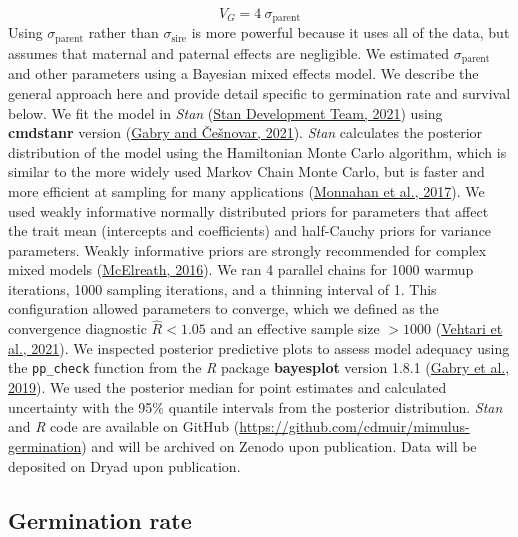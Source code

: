 \documentclass[
  12pt,
]{article}
\begin{document}
\[V_G = 4~\sigma_{\mathrm{parent}}\]
Using \(\sigma_{\mathrm{parent}}\) rather than \(\sigma_{\mathrm{sire}}\) is more powerful because it uses all of the data, but assumes that maternal and paternal effects are negligible. We estimated \(\sigma_{\mathrm{parent}}\) and other parameters using a Bayesian mixed effects model. We describe the general approach here and provide detail specific to germination rate and survival below. We fit the model in \emph{Stan} (\protect\hyperlink{ref-stan_development_team_stan_2021}{Stan Development Team, 2021}) using \textbf{cmdstanr} version (\protect\hyperlink{ref-gabry_cmdstanr_2021}{Gabry and Češnovar, 2021}). \emph{Stan} calculates the posterior distribution of the model using the Hamiltonian Monte Carlo algorithm, which is similar to the more widely used Markov Chain Monte Carlo, but is faster and more efficient at sampling for many applications (\protect\hyperlink{ref-monnahan_faster_2017}{Monnahan et al., 2017}). We used weakly informative normally distributed priors for parameters that affect the trait mean (intercepts and coefficients) and half-Cauchy priors for variance parameters. Weakly informative priors are strongly recommended for complex mixed models (\protect\hyperlink{ref-mcelreath_statistical_2016}{McElreath, 2016}). We ran 4 parallel chains for 1000 warmup iterations, 1000 sampling iterations, and a thinning interval of 1. This configuration allowed parameters to converge, which we defined as the convergence diagnostic \(\hat{R} < 1.05\) and an effective sample size \(>1000\) (\protect\hyperlink{ref-vehtari_rank-normalization_2021}{Vehtari et al., 2021}). We inspected posterior predictive plots to assess model adequacy using the \texttt{pp\_check} function from the \emph{R} package \textbf{bayesplot} version 1.8.1 (\protect\hyperlink{ref-gabry_visualization_2019}{Gabry et al., 2019}). We used the posterior median for point estimates and calculated uncertainty with the 95\% quantile intervals from the posterior distribution. \emph{Stan} and \emph{R} code are available on GitHub (\url{https://github.com/cdmuir/mimulus-germination}) and will be archived on Zenodo upon publication. Data will be deposited on Dryad upon publication.

\hypertarget{germination-rate}{%
\subsection{Germination rate}\label{germination-rate}}
\end{document}

